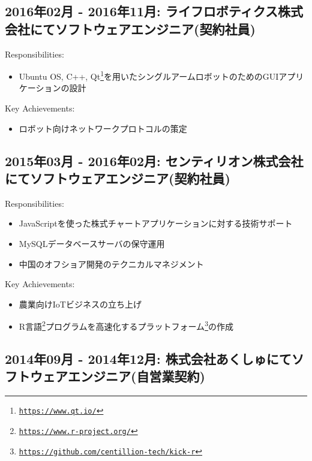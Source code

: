 \documentclass[letterpaper]{article}
\begin{document}
\subsection*{2016年02月 - 2016年11月: ライフロボティクス株式会社にてソフトウェアエンジニア(契約社員)}

\noindent Responsibilities:

\begin{itemize}
  \item Ubuntu OS, C++, Qt\footnote{\href{https://www.qt.io/}{\tt https://www.qt.io/}}を用いたシングルアームロボットのためのGUIアプリケーションの設計
\end{itemize}

\noindent Key Achievements:

\begin{itemize}
  \item ロボット向けネットワークプロトコルの策定
\end{itemize}

\subsection*{2015年03月 - 2016年02月: センティリオン株式会社にてソフトウェアエンジニア(契約社員)}

\noindent Responsibilities:

\begin{itemize}
  \item JavaScriptを使った株式チャートアプリケーションに対する技術サポート
  \item MySQLデータベースサーバの保守運用
  \item 中国のオフショア開発のテクニカルマネジメント
\end{itemize}

\noindent Key Achievements:

\begin{itemize}
  \item 農業向けIoTビジネスの立ち上げ
  \item R言語\footnote{\href{https://www.r-project.org/}{\tt https://www.r-project.org/}}プログラムを高速化するプラットフォーム\footnote{\href{https://github.com/centillion-tech/kick-r}{\tt https://github.com/centillion-tech/kick-r}}の作成
\end{itemize}

\subsection*{2014年09月 - 2014年12月: 株式会社あくしゅにてソフトウェアエンジニア(自営業契約)}
\end{document}
